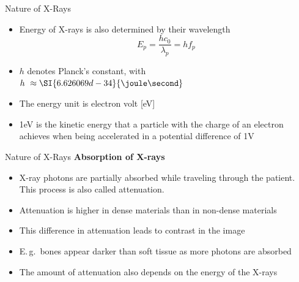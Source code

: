 \begin{frame}{Nature of X-Rays}
    \begin{itemize}
        \item Energy of X-rays is also determined by their wavelength
              \begin{equation*}
                  E_p = \frac{h c_0}{\lambda_p} = h f_p
              \end{equation*}
      \item {$h$ denotes Planck's constant, with $h\ \approx\SI{6.626069d-34}{\joule\second}$}\\
        \item {The energy unit is electron volt [eV]}
        \item {1eV is the kinetic energy that a particle with the charge of an electron achieves when being accelerated in a potential difference of 1V}
    \end{itemize}
\end{frame}

\begin{frame}{Nature of X-Rays}
    \textbf{Absorption of X-rays}
    \begin{itemize}
        \setlength\itemsep{0.2cm}
        \item X-ray photons are partially absorbed while traveling through the patient. This process is also called attenuation.
        \item Attenuation is higher in dense materials than in non-dense materials
        \item This difference in attenuation leads to contrast in the image
        \item E.\,g.\ bones appear darker than soft tissue as more photons are absorbed
        \item The amount of attenuation also depends on the energy of the X-rays
    \end{itemize}
\end{frame}


